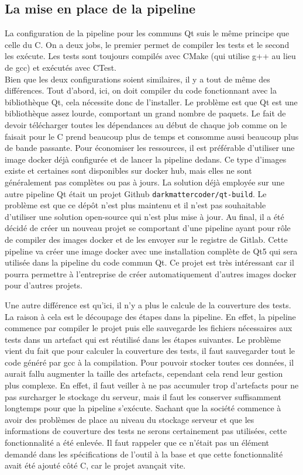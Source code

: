 \documentclass[a4paper]{article}
\begin{document}
\subsection{La mise en place de la pipeline}%

La configuration de la pipeline pour les communs Qt suis le même principe que
celle du C. On a deux jobs, le premier permet de compiler les tests et le second
les exécute. Les tests sont toujours compilés avec CMake (qui utilise g++ au
lieu de gcc) et exécutés avec CTest.\\

Bien que les deux configurations soient similaires, il y a tout de même des
différences. Tout d'abord, ici, on doit compiler du code fonctionnant avec la
bibliothèque Qt, cela nécessite donc de l'installer. Le problème est que Qt est
une bibliothèque assez lourde, comportant un grand nombre de paquets. Le fait de
devoir télécharger toutes les dépendances au début de chaque job comme on le
faisait pour le C prend beaucoup plus de temps et consomme aussi beaucoup plus
de bande passante. Pour économiser les ressources, il est préférable d'utiliser
une image docker déjà configurée et de lancer la pipeline dedans. Ce type
d'images existe et certaines sont disponibles sur docker hub, mais elles ne sont
généralement pas complètes ou pas à jours. La solution déjà employée sur une
autre pipeline Qt était un projet Github \verb|darkmattercoder/qt-build|. Le
problème est que ce dépôt n'est plus maintenu et il n'est pas souhaitable
d'utiliser une solution open-source qui n'est plus mise à jour. Au final, il a
été décidé de créer un nouveau projet se comportant d'une pipeline ayant pour
rôle de compiler des images docker et de les envoyer sur le registre de Gitlab.
Cette pipeline va créer une image docker avec une installation complète de Qt5
qui sera utilisée dans la pipeline du code commun Qt. Ce projet est très
intéressant car il pourra permettre à l'entreprise de créer automatiquement
d'autres images docker pour d'autres projets.

Une autre différence est qu'ici, il n'y a plus le calcule de la couverture des
tests. La raison à cela est le découpage des étapes dans la pipeline. En effet,
la pipeline commence par compiler le projet puis elle sauvegarde les fichiers
nécessaires aux tests dans un artefact qui est réutilisé dans les étapes
suivantes. Le problème vient du fait que pour calculer la couverture des tests,
il faut sauvegarder tout le code généré par gcc à la compilation. Pour pouvoir
stocker toutes ces données, il aurait fallu augmenter la taille des artefacts,
cependant cela rend leur gestion plus complexe. En effet, il faut veiller à ne
pas accumuler trop d'artefacts pour ne pas surcharger le stockage du serveur,
mais il faut les conserver suffisamment longtemps pour que la pipeline
s'exécute. Sachant que la société commence à avoir des problèmes de place au
niveau du stockage serveur et que les informations de couverture des tests ne
serons certainement pas utilisées, cette fonctionnalité a été enlevée. Il faut
rappeler que ce n'était pas un élément demandé dans les spécifications de l'outil
à la base et que cette fonctionnalité avait été ajouté côté C, car le projet
avançait vite.
\end{document}
